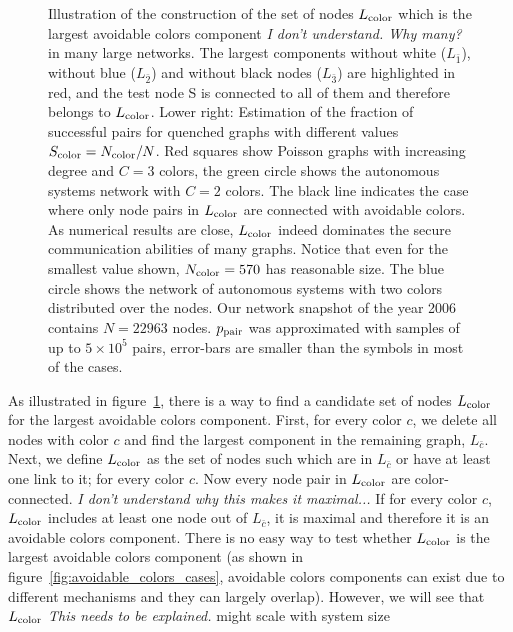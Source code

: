 \documentclass[aps, pre, twocolumn, a4paper, floatfix]{revtex4}
\newcommand{\red}{\color{red}}
\begin{document}
\begin{figure}[htb]
\begin{center}
    \caption{Illustration of the construction of the  set of nodes $L_{\rm color}$ which is the largest avoidable colors component {\red \textit{I don't understand.  Why many?} in many large networks. }
    The largest components without white ($L_{\bar 1}$), without blue ($L_{\bar 2}$) and without 
    black nodes ($L_{\bar 3}$) are highlighted in red, and the test node S is connected to 
    all of them and therefore belongs to $L_{\rm color}$. Lower right: Estimation of the fraction 
    of successful pairs for quenched graphs with different values $S_{\rm color}=N_{\rm color}/N$. 
    Red squares show Poisson graphs with increasing degree and $C=3$ colors, the green circle 
    shows the autonomous systems network with $C=2$ colors. The black line indicates the case 
    where only node pairs in $L_{\rm color}$ are connected with avoidable colors. As numerical 
    results are close, $L_{\rm color}$ indeed dominates the secure communication abilities of many
    graphs.
    Notice that even for the smallest value shown, $N_{\rm color}=570$ has reasonable size. The blue circle shows the network of autonomous systems with two colors distributed over the nodes. Our network 
snapshot of the year 2006 contains $N=22963$ nodes. $p_{\rm pair}$ was approximated with 
samples of up to $5\times 10^5$ pairs, error-bars are smaller than the symbols in most 
of the cases. 
    }
    \label{fig:avoidable_colors_candidate}
\end{center}
\end{figure}
%
As illustrated in figure~\ref{fig:avoidable_colors_candidate}, 
there is a way to find a candidate set of nodes $L_{\rm color}$ 
for the largest avoidable colors component.
First, for every color $c$, we delete all nodes with color $c$ 
and find the largest component in the remaining graph, $L_{\bar c}$. 
Next, we define $L_{\rm color}$ as the set of nodes such which are in $L_{\bar c}$ or have at least one link to it; for every color $c$. 
Now every node pair in $L_{\rm color}$ are color-connected. 
{\red \textit{I don't understand why this makes it maximal...}
If for every color $c$, $L_{\rm color}$ includes at least one node out of $L_{\bar c}$, 
it is maximal and therefore it is an avoidable colors component. }
There is no easy way to test whether $L_{\rm color}$ is the largest avoidable colors component 
(as shown in figure~\ref{fig:avoidable_colors_cases}, avoidable colors components can exist due to 
different mechanisms and they can largely overlap). 
However, we will see that $L_{\rm color}$ {\red \textit{This needs to be explained.} might} scale with system size 
\end{document}

